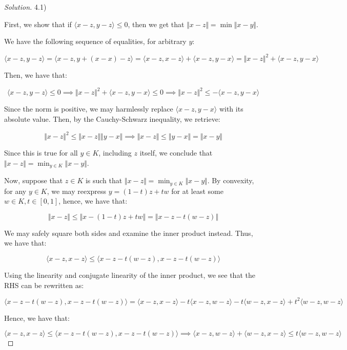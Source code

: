 \documentclass[10pt]{article}
\begin{document}
\begin{proof}[Solution]

4.1)

First, we show that if $\langle x - z, y - z \rangle \leq 0$, then we get that $\Vert x - z \Vert = \min \Vert x - y \Vert$.

We have the following sequence of equalities, for arbitrary $y$:

$$ \langle x - z, y - z \rangle = \langle x - z, y + (x - x) - z \rangle = \langle x - z, x - z \rangle + \langle x - z, y - x \rangle = \Vert x - z \Vert^2 + \langle x - z, y - x\rangle$$

Then, we have that:

$$ \langle x - z, y - z \rangle \leq 0 \implies \Vert x - z \Vert^2 + \langle x - z, y - x\rangle \leq 0 \implies \Vert x - z \Vert^2 \leq -\langle x - z, y - x\rangle $$

Since the norm is positive, we may harmlessly replace $\langle x - z, y - x \rangle $ with its absolute value. Then, by the Cauchy-Schwarz inequality, we retrieve:

$$ \Vert x - z \Vert^2 \leq \Vert x - z \Vert \Vert y - x \Vert  \implies \Vert x - z \Vert \leq \Vert y - x \Vert = \Vert x - y \Vert$$

Since this is true for all $y \in K$, including $z$ itself, we conclude that $\Vert x - z \Vert = \min_{y \in K } \Vert x - y \Vert$.

Now, suppose that $z \in K$ is such that $\Vert x - z \Vert = \min_{y \in K} \Vert x - y \Vert$. By convexity, for any $y \in K$, we may reexpress $y = (1-t)z + tw$ for at least some $w \in K, t \in [0,1]$, hence, we have that:

$$ \Vert x - z \Vert \leq \Vert x - (1-t)z + tw \Vert = \Vert x - z - t(w - z) \Vert $$

We may safely square both sides and examine the inner product instead. Thus, we have that:

$$ \langle x - z, x - z \rangle \leq \langle x - z - t(w - z), x - z - t(w - z) \rangle $$

Using the linearity and conjugate linearity of the inner product, we see that the RHS can be rewritten as:

$$   \langle x - z - t(w - z), x - z - t(w - z) \rangle = \langle x - z, x - z \rangle -  t\langle x - z, w - z \rangle - t \langle  w - z, x - z \rangle + t^2 \langle w - z, w - z \rangle$$

Hence, we have that:

$$  \langle x - z, x - z \rangle \leq \langle x - z - t(w - z), x - z - t(w - z) \rangle  \implies \langle x - z, w - z \rangle + \langle w - z, x - z \rangle \leq t \langle w - z , w - z \rangle $$


\end{proof}
\end{document}
